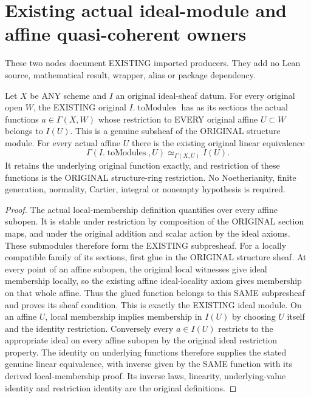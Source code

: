 \section{Existing actual ideal-module and affine quasi-coherent owners}
These two nodes document EXISTING imported producers. They add no Lean
source, mathematical result, wrapper, alias or package dependency.

\begin{proposition}
\label{scheme:existing-ideal-module-affine-sections}
\leanok
{}
Let $X$ be ANY scheme and $I$ an original ideal-sheaf datum. For every
original open $W$, the EXISTING original $I.\operatorname{toModules}$
has as its sections the actual functions $a\in\Gamma(X,W)$ whose
restriction to EVERY original affine $U\subset W$ belongs to $I(U)$.
This is a genuine subsheaf of the ORIGINAL structure module. For every
actual affine $U$ there is the existing original linear equivalence
\[
 \Gamma(I.\operatorname{toModules},U)\simeq_{\Gamma(X,U)} I(U).
\]
It retains the underlying original function exactly, and restriction
of these functions is the ORIGINAL structure-ring restriction. No
Noetherianity, finite generation, normality, Cartier, integral or
nonempty hypothesis is required.
\end{proposition}
\begin{proof}
The actual local-membership definition quantifies over every affine
subopen. It is stable under restriction by composition of the ORIGINAL
section maps, and under the original addition and scalar action by the
ideal axioms. These submodules therefore form the EXISTING subpresheaf.
For a locally compatible family of its sections, first glue in the
ORIGINAL structure sheaf. At every point of an affine subopen, the
original local witnesses give ideal membership locally, so the existing
affine ideal-locality axiom gives membership on that whole affine.
Thus the glued function belongs to this SAME subpresheaf and proves
its sheaf condition. This is exactly the EXISTING ideal module.
On an affine $U$, local membership implies membership in $I(U)$ by
choosing $U$ itself and the identity restriction. Conversely every
$a\in I(U)$ restricts to the appropriate ideal on every affine subopen
by the original ideal restriction property. The identity on underlying
functions therefore supplies the stated genuine linear equivalence,
with inverse given by the SAME function with its derived local-membership
proof. Its inverse laws, linearity, underlying-value identity and
restriction identity are the original definitions.
\end{proof}

